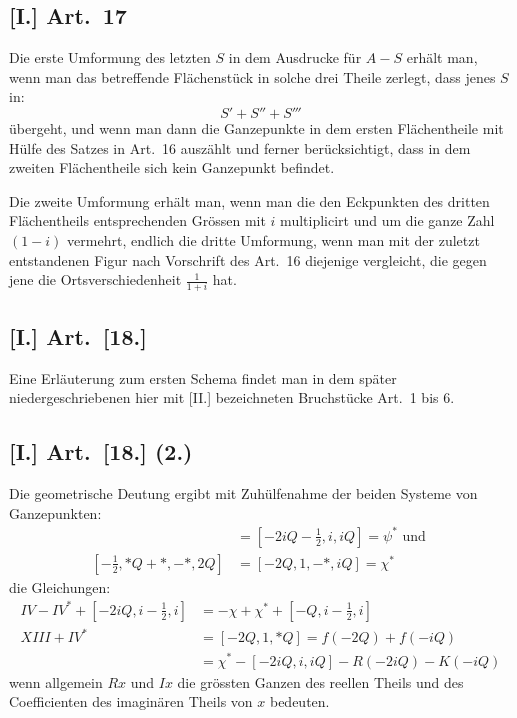 \documentclass[12pt,a4paper]{article}
\begin{document}
\subsection*{[I.] Art.~17}

Die erste Umformung des letzten $S$ in dem Ausdrucke für $A - S$ erhält man, wenn man das betreffende Flächenstück in solche drei Theile zerlegt, dass jenes $S$ in:
\[
S' + S'' + S'''
\]
übergeht, und wenn man dann die Ganzepunkte in dem ersten Flächentheile mit Hülfe des Satzes in Art.~16 auszählt und ferner berücksichtigt, dass in dem zweiten Flächentheile sich kein Ganzepunkt befindet.

Die zweite Umformung erhält man, wenn man die den Eckpunkten des dritten Flächentheils entsprechenden Grössen mit $i$ multiplicirt und um die ganze Zahl $(1-i)$ vermehrt, endlich die dritte Umformung, wenn man mit der zuletzt entstandenen Figur nach Vorschrift des Art.~16 diejenige vergleicht, die gegen jene die Ortsverschiedenheit $\frac{1}{1+i}$ hat.

\subsection*{[I.] Art.~[18.]}

Eine Erläuterung zum ersten Schema findet man in dem später niedergeschriebenen hier mit [II.] bezeichneten Bruchstücke Art.~1 bis 6.

\subsection*{[I.] Art.~[18.] (2.)}

Die geometrische Deutung ergibt mit Zuhülfenahme der beiden Systeme von Ganzepunkten:
\begin{align*}
[-2iQ - \frac{1}{2}, *, iQ] &= [-2iQ - \frac{1}{2}, i, iQ] = \psi^* \text{ und }\\
[-\frac{1}{2}, *Q + *, -*, 2Q] &= [-2Q, 1, -*, iQ] = \chi^*
\end{align*}
die Gleichungen:
\begin{align*}
IV - IV^* + [-2iQ, i - \frac{1}{2}, i] &= -\chi + \chi^* + [-Q, i - \frac{1}{2}, i]\\
XIII + IV^* &= [-2Q, 1, *Q] = f(-2Q) + f(-iQ)\\
&= \chi^* - [-2iQ, i, iQ] - R(-2iQ) - K(-iQ)
\end{align*}
 wenn allgemein $Rx$ und $Ix$ die grössten Ganzen des reellen Theils und des Coefficienten des imaginären Theils von $x$ bedeuten.
\end{document}

